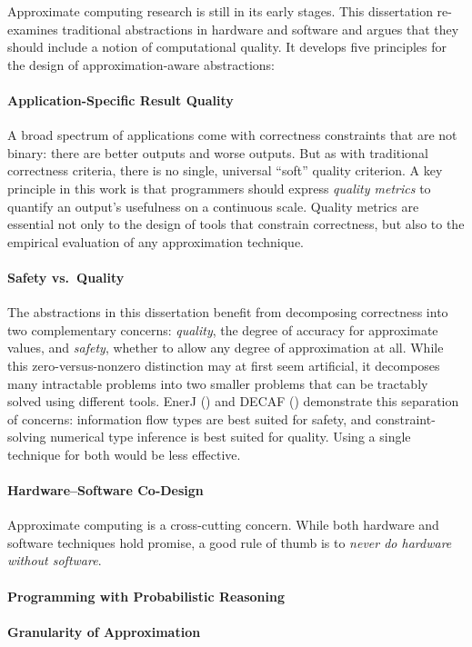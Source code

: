 Approximate computing research is still in its early stages.
This dissertation re-examines traditional abstractions in hardware and
software and argues that they should include a notion of computational
quality.
It develops five principles for the design of approximation-aware
abstractions:

\paragraph{Application-Specific Result Quality}
A broad spectrum of applications come with correctness constraints that are
not binary:
there are better outputs and worse outputs.
But as with traditional correctness criteria, there is no single, universal
``soft'' quality criterion.
A key principle in this work is that programmers should express
\emph{quality metrics} to quantify an output's usefulness on a continuous
scale.
Quality metrics are essential not only to the design of tools that constrain
correctness,
but also to the empirical evaluation of any approximation technique.

\paragraph{Safety vs.~Quality}
The abstractions in this dissertation benefit from decomposing correctness
into two complementary concerns:
\emph{quality}, the degree of accuracy for approximate values, and
\emph{safety}, whether to allow any degree of approximation at all.
While this zero-versus-nonzero distinction may at first seem artificial, it
decomposes many intractable problems into two smaller problems that can be
tractably solved using different tools.
EnerJ () and DECAF () demonstrate this separation of
concerns:
information flow types are best suited for safety,
and constraint-solving numerical type inference is best suited for quality.
Using a single technique for both would be less effective.

\paragraph{Hardware--Software Co-Design}
Approximate computing is a cross-cutting concern.
While both hardware and software techniques hold promise, a good rule of thumb
is to \emph{never do hardware without software}.

\paragraph{Programming with Probabilistic Reasoning}

\paragraph{Granularity of Approximation}
